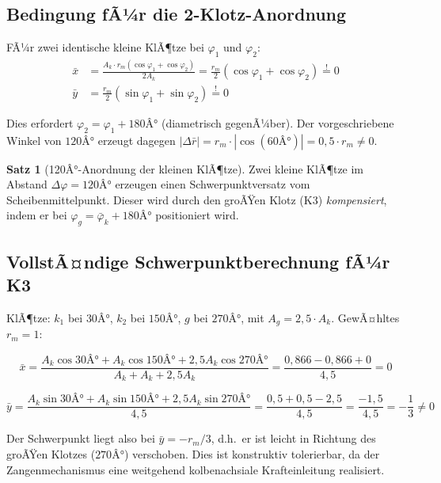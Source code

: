 ﻿\documentclass[12pt,a4paper]{article}
\theoremstyle{definition}
\newtheorem{satz}{Satz}[section]
\begin{document}
\subsection{Bedingung fÃ¼r die 2-Klotz-Anordnung}

FÃ¼r zwei identische kleine KlÃ¶tze bei $\varphi_1$ und $\varphi_2$:
\begin{align}
  \bar{x} &= \frac{A_k \cdot r_m (\cos\varphi_1 + \cos\varphi_2)}{2 A_k}
           = \frac{r_m}{2}(\cos\varphi_1 + \cos\varphi_2) \stackrel{!}{=} 0 \\
  \bar{y} &= \frac{r_m}{2}(\sin\varphi_1 + \sin\varphi_2) \stackrel{!}{=} 0
\end{align}

Dies erfordert $\varphi_2 = \varphi_1 + 180Â°$ (diametrisch gegenÃ¼ber).
Der vorgeschriebene Winkel von $120Â°$ erzeugt dagegen
$|\Delta\bar{r}| = r_m \cdot |\cos(60Â°)| = 0{,}5 \cdot r_m \neq 0$.

\begin{satz}[120Â°-Anordnung der kleinen KlÃ¶tze]
  Zwei kleine KlÃ¶tze im Abstand $\Delta\varphi = 120Â°$ erzeugen einen
  Schwerpunktversatz vom Scheibenmittelpunkt.  Dieser wird durch den
  groÃŸen Klotz (K3) \emph{kompensiert}, indem er bei
  $\varphi_g = \bar{\varphi}_k + 180Â°$ positioniert wird.
  \label{satz:120}
\end{satz}

\subsection{VollstÃ¤ndige Schwerpunktberechnung fÃ¼r K3}

KlÃ¶tze: $k_1$ bei $30Â°$, $k_2$ bei $150Â°$, $g$ bei $270Â°$,
mit $A_g = 2{,}5 \cdot A_k$. GewÃ¤hltes $r_m = 1$:

\begin{equation}
  \bar{x} = \frac{A_k \cos 30Â° + A_k \cos 150Â° + 2{,}5 A_k \cos 270Â°}
                 {A_k + A_k + 2{,}5 A_k}
          = \frac{0{,}866 - 0{,}866 + 0}{4{,}5} = 0
\end{equation}

\begin{equation}
  \bar{y} = \frac{A_k \sin 30Â° + A_k \sin 150Â° + 2{,}5 A_k \sin 270Â°}
                 {4{,}5}
          = \frac{0{,}5 + 0{,}5 - 2{,}5}{4{,}5}
          = \frac{-1{,}5}{4{,}5} = -\frac{1}{3} \neq 0
\end{equation}

Der Schwerpunkt liegt also bei $\bar{y} = -r_m/3$, d.h.\ er ist leicht
in Richtung des groÃŸen Klotzes ($270Â°$) verschoben.  Dies ist
konstruktiv tolerierbar, da der Zangenmechanismus eine weitgehend
kolbenachsiale Krafteinleitung realisiert.
\end{document}
